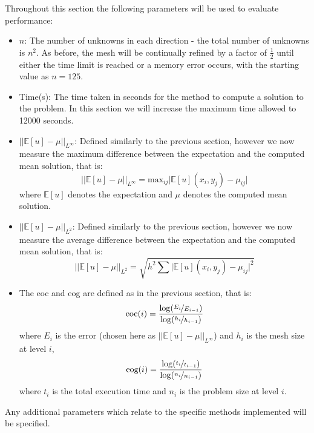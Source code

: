 \documentclass[11pt]{article}
\numberwithin{equation}{section}
\begin{document}
Throughout this section the following parameters will be used to evaluate performance:
\begin{itemize}
\item $n$: The number of unknowns in each direction - the total number of unknowns is $n^2$. As before, the mesh will be continually refined by a factor of $\frac{1}{2}$ until either the time limit is reached or a memory error occurs, with the starting value as $n=125$.
\item Time(s): The time taken in seconds for the method to compute a solution to the problem. In this section we will increase the maximum time allowed to 12000 seconds. 
\item $|| \mathbb{E}[u] - \mu ||_{L^\infty} $: Defined similarly to the previous section, however we now measure the maximum difference between the expectation and the computed mean solution, that is:
 \[ || \mathbb{E}[u] - \mu ||_{L^\infty} = \text{max}_{ij} \big| \mathbb{E}[u](x_i,y_j) - \mu_{ij} \big| \]
where $\mathbb{E}[u]$ denotes the expectation and $\mu$ denotes the computed mean solution.
\item $\left|\left| \mathbb{E}[u] - \mu \right|\right|_{L^2}$: Defined similarly to the previous section, however we now measure the average difference between the expectation and the computed mean solution, that is:
\[ \left| \left| \mathbb{E}[u] - \mu \right| \right|_{L^2} = \sqrt{h^2 \sum \big| \mathbb{E}[u](x_i,y_j) - \mu_{ij} \big|^2} \]
\item The eoc and eog are defined as in the previous section, that is:
\[ \text{eoc}(i) = \frac{\log(\nicefrac{E_i}{E_{i-1}})}{\log(\nicefrac{h_i}{h_{i-1}})} \]
where $E_i$ is the error (chosen here as $|| \mathbb{E}[u] - \mu ||_{L^\infty}$) and $h_i$ is the mesh size at level $i$,
\[ \text{eog}(i) = \frac{\log(\nicefrac{t_{i}}{t_{i-1}})}{\log(\nicefrac{n_{i}}{n_{i-1}})} \]
where $t_i$ is the total execution time and $n_i$ is the problem size at level $i$.
\end{itemize}
Any additional parameters which relate to the specific methods implemented will be specified. 
\end{document}
